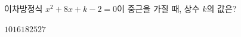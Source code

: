 이차방정식 $x^2+8x+k-2=0$이 중근을 가질 때, 상수 $k$의 값은?
\begin{choices32}{$10$}{$16$}{$18$}{$25$}{$27$}\end{choices32}
